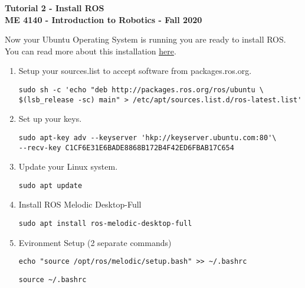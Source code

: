 \documentclass[12pt]{article}
\begin{document}
\thispagestyle{plain}

\begin{center}
	   {\bf \Large Tutorial 2 - Install ROS }\vspace{5mm} \\
   {\bf \large ME 4140 - Introduction to Robotics - Fall 2020} \vspace{2mm}\\
\end{center}



		{ Now your Ubuntu Operating System is running you are ready to install ROS. You can read more about this installation \href{http://wiki.ros.org/melodic/Installation/Ubuntu}{here}.}

\begin{enumerate}
	
	
	\item  Setup your sources.list to accept software from packages.ros.org.


	\begin{verbatim}
sudo sh -c 'echo "deb http://packages.ros.org/ros/ubuntu \
$(lsb_release -sc) main" > /etc/apt/sources.list.d/ros-latest.list'
	\end{verbatim}
	
	\item Set up your keys. 
	
	\begin{verbatim}
sudo apt-key adv --keyserver 'hkp://keyserver.ubuntu.com:80'\
--recv-key C1CF6E31E6BADE8868B172B4F42ED6FBAB17C654	
	\end{verbatim}			
	
	\item Update your Linux system. 
	
	\begin{verbatim}
sudo apt update
	\end{verbatim}	
	
	\item Install ROS Melodic Desktop-Full 
	\begin{verbatim}
sudo apt install ros-melodic-desktop-full
	\end{verbatim}
	
	\item Evironment Setup (2 separate commands) 
	\begin{verbatim} 
echo "source /opt/ros/melodic/setup.bash" >> ~/.bashrc
	\end{verbatim}
	\begin{verbatim} 
source ~/.bashrc 
	\end{verbatim}


\end{enumerate}
\end{document}
